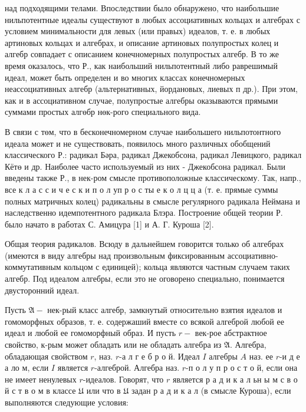 \documentclass[10pt]{article}
\begin{document}
над подходящими телами. Впоследствии было обнаружено, что наибольшие нильпотентные идеалы существуют в любых ассоциативных кольцах и алгебрах с условием минимальности для левых (или правых) идеалов, т. е. в любых артиновых кольцах и алгебрах, и описание артиновых полупростых колец и алгебр совпадает с описанием конечномерных полупростых алгебр. В то же время оказалось, что Р., как наибольший нильпотентный либо раврешимый идеал, может быть определен и во многих классах конечномерных неассоциативных алгебр (альтернативных, йордановых, лиевых п др.). При этом, как и в ассоциативном случае, полупростые алгебры оказываются прямыми суммами простых алгөбр нөк-рого специального вида.



В связи с төм, что в бесконечномерном случае наибольшего нильпотонтного идеала может и не существовать, появилось много различных обобщений классического Р.: радикал Бәра, радикал Джекобсона, радикал Левицкого, радикал Кётө и др. Наиболее часто используемый из них - Джекобсона радикал. Были введены также Р., в нек-ром смысле противоположные классическому. Так, напр., все к л а с с и ч е с к и п о л уп р о с ты е к о л ц ц а (т. е. прямые суммы полных матричных колец) радикальны в смысле регулярного радикала Неймана и наследственно идемпотентного радикала Блэра. Построение общей теории Р. было начато в работах С. Амицура [1] и А. Г. Куроша [2].



Общая теория радикалов. Всюду в дальнейшем говорится только об алгебрах (имеются в виду алгебры над произвольным фиксированным ассоциативно-коммутативным кольцом с единицей); кольца являются частным случаем таких алгебр. Под идеалом алгебры, если это не оговорено специально, понимается двусторонний идеал.



Пусть $\mathfrak{A}-$ нек-рый класс алгебр, замкнутый относительно взятия идеалов и гомоморфных образов, т. е. содержаший вместе со всякой алгеброй любой ее идеал и любой ее гомоморфный образ. И пусть $r-$ век-рое абстрактное свойство, к-рым может обладать или не обладать алгебра из $\mathfrak{A}$. Алгебра, обладающая свойством $r$, наз. $r$-а л г е б р о й. Идеал $I$ алгебры $A$ наз. ее $r$-и д е а ло м, если $I$ является $r$-алгеброй. Алгебра наз. $r$-п о л у п р о с т о й, если она не имеет ненулевых $r$-идеалов. Говорят, что $r$ является р а д и к а л ьн ы м с в о й с т в о м в классе $\mathfrak{U}$ или что в $\mathfrak{U}$ задан р а д и к а л (в смысле Куроша), если выполняются следующие условия:
\end{document}
